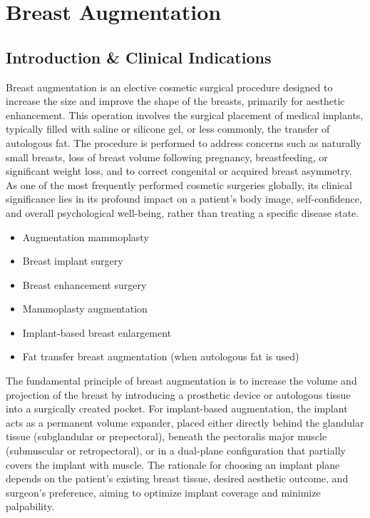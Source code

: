 \chapter{Breast Augmentation}

\section*{Introduction \& Clinical Indications}
Breast augmentation is an elective cosmetic surgical procedure designed to increase the size and improve the shape of the breasts, primarily for aesthetic enhancement. This operation involves the surgical placement of medical implants, typically filled with saline or silicone gel, or less commonly, the transfer of autologous fat. The procedure is performed to address concerns such as naturally small breasts, loss of breast volume following pregnancy, breastfeeding, or significant weight loss, and to correct congenital or acquired breast asymmetry. As one of the most frequently performed cosmetic surgeries globally, its clinical significance lies in its profound impact on a patient's body image, self-confidence, and overall psychological well-being, rather than treating a specific disease state.

\begin{itemize}
  \item Augmentation mammoplasty
  \item Breast implant surgery
  \item Breast enhancement surgery
  \item Mammoplasty augmentation
  \item Implant-based breast enlargement
  \item Fat transfer breast augmentation (when autologous fat is used)
\end{itemize}

The fundamental principle of breast augmentation is to increase the volume and projection of the breast by introducing a prosthetic device or autologous tissue into a surgically created pocket. For implant-based augmentation, the implant acts as a permanent volume expander, placed either directly behind the glandular tissue (subglandular or prepectoral), beneath the pectoralis major muscle (submuscular or retropectoral), or in a dual-plane configuration that partially covers the implant with muscle. The rationale for choosing an implant plane depends on the patient's existing breast tissue, desired aesthetic outcome, and surgeon's preference, aiming to optimize implant coverage and minimize palpability.

